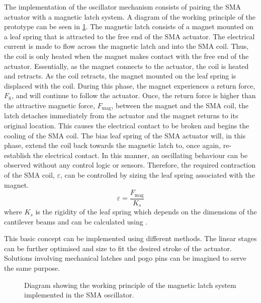 The implementation of the oscillator mechanism consists of pairing the SMA actuator with a magnetic latch system. A diagram of the working principle of the prototype can be seen in \cref{fig:oscillator-schematic}. The magnetic latch consists of a magnet mounted on a leaf spring that is attracted to the free end of the SMA actuator. The electrical current is made to flow across the magnetic latch and into the SMA coil. Thus, the coil is only heated when the magnet makes contact with the free end of the actuator. Essentially, as the magnet connects to the actuator, the coil is heated and retracts. As the coil retracts, the magnet mounted on the leaf spring is displaced with the coil. During this phase, the magnet experiences a return force, $F_\textrm{S}$, and will continue to follow the actuator. Once, the return force is higher than the attractive magnetic force, $F_\textrm{mag}$, between the magnet and the SMA coil, the latch detaches immediately from the actuator and the magnet returns to its original location. This causes the electrical contact to be broken and begins the cooling of the SMA coil. The bias leaf spring of the SMA actuator will, in this phase, extend the coil back towards the magnetic latch to, once again, re-establish the electrical contact. In this manner, an oscillating behaviour can be observed without any control logic or sensors. Therefore, the required contraction of the SMA coil, $\varepsilon$, can be controlled by sizing the leaf spring associated with the magnet.
\begin{equation}\label{eq:sma-contraction}
    \varepsilon = \frac{F_\textrm{mag}}{K_s}
\end{equation}
where $K_s$ is the rigidity of the leaf spring which depends on the dimensions of the cantilever beams and can be calculated using \cite{henein-2017, howell_handbook_2013}.

This basic concept can be implemented using different methods. The linear stages can be further optimised and size to fit the desired stroke of the actuator. Solutions involving mechanical latches and pogo pins can be imagined to serve the same purpose.

\begin{figure}[ht] %
  \centering
  \resizebox{0.6\textwidth}{!}{}
  \caption{Diagram showing the working principle of the magnetic latch system implemented in the SMA oscillator.}
  \label{fig:oscillator-schematic}
\end{figure}


